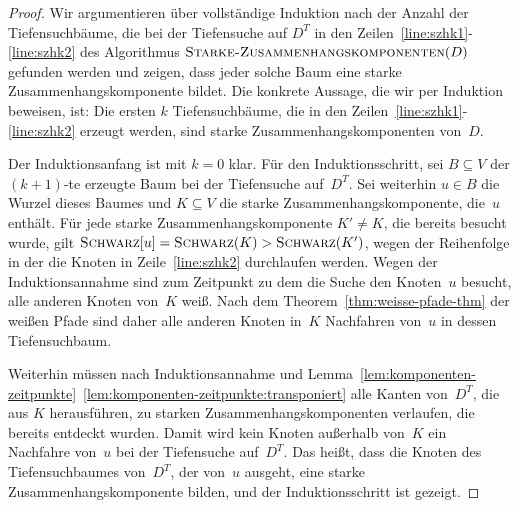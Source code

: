 \begin{proof}
Wir argumentieren über vollständige Induktion nach der Anzahl der Tiefensuchbäume, die bei der Tiefensuche auf $D^T$ in den Zeilen~\ref{line:szhk1}-\ref{line:szhk2} des Algorithmus $\mathop{\text{\textsc{Starke-Zusammenhangskomponenten}}}(D)$ gefunden werden und zeigen, dass jeder solche Baum eine starke Zusammenhangskomponente bildet.
Die konkrete Aussage, die wir per Induktion beweisen, ist: \glqq Die ersten $k$ Tiefensuchbäume, die in den Zeilen~\ref{line:szhk1}-\ref{line:szhk2} erzeugt werden, sind starke Zusammenhangskomponenten von~$D$.\grqq

Der Induktionsanfang ist mit $k=0$ klar.
Für den Induktionsschritt, sei $B \subseteq V$ der $(k+1)$-te erzeugte Baum bei der Tiefensuche auf~$D^T$.
Sei weiterhin $u \in B$ die Wurzel dieses Baumes und $K \subseteq V$ die starke Zusammenhangskomponente, die~$u$ enthält.
Für jede starke Zusammenhangskomponente $K' \neq K$, die bereits besucht wurde, gilt $\mathop{\text{\textsc{Schwarz}}}[u] = \mathop{\text{\textsc{Schwarz}}}(K) > \mathop{\text{\textsc{Schwarz}}}(K')$, wegen der Reihenfolge in der die Knoten in Zeile~\ref{line:szhk2} durchlaufen werden.
Wegen der Induktionsannahme sind zum Zeitpunkt zu dem die Suche den Knoten~$u$ besucht, alle anderen Knoten von~$K$ weiß.
Nach dem Theorem~\ref{thm:weisse-pfade-thm} der weißen Pfade sind daher alle anderen Knoten in~$K$ Nachfahren von~$u$ in dessen Tiefensuchbaum.

Weiterhin müssen nach Induktionsannahme und Lemma~\ref{lem:komponenten-zeitpunkte}~\ref{lem:komponenten-zeitpunkte:transponiert} alle Kanten von~$D^T$, die aus $K$ herausführen, zu starken Zusammenhangskomponenten verlaufen, die bereits entdeckt wurden.
Damit wird kein Knoten außerhalb von~$K$ ein Nachfahre von~$u$ bei der Tiefensuche auf~$D^T$.
Das heißt, dass die Knoten des Tiefensuchbaumes von~$D^T$, der von~$u$ ausgeht, eine starke Zusammenhangskomponente bilden, und der Induktionsschritt ist gezeigt.
\end{proof}

